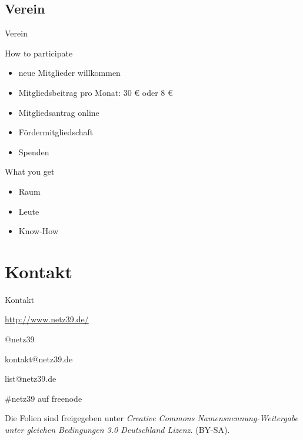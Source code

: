 \documentclass[hyperref={pdfpagelabels=false}]{beamer}
\begin{document}
\subsection{Verein}

\begin{frame}{Verein}
    \begin{block}{How to participate}
        \begin{itemize}
            \item neue Mitglieder willkommen
            \item Mitgliedsbeitrag pro Monat: 30 € oder 8 €
            \item Mitgliedsantrag online
            \pause
            \item Fördermitgliedschaft
            \item Spenden
        \end{itemize}
    \end{block}
    \pause
    \begin{block}{What you get}
        \begin{itemize}
            \item Raum
            \item Leute
            \item Know-How
        \end{itemize}
    \end{block}
\end{frame}

\section{Kontakt}

\begin{frame}{Kontakt}
    \begin{description}
        \item[WWW] \url{http://www.netz39.de/}
        \item[Twitter/identi.ca] @netz39
        \item[E-Mail] kontakt@netz39.de
        \item[Mailingliste] list@netz39.de
        \item[IRC] \#netz39 auf freenode
    \end{description}

    \vspace{1em}
    \small
    Die Folien sind freigegeben unter \emph{Creative Commons
    Namensnennung-Weitergabe unter gleichen Bedingungen 3.0 Deutschland
    Lizenz.} (BY-SA).
    \normalsize
\end{frame}
\end{document}
